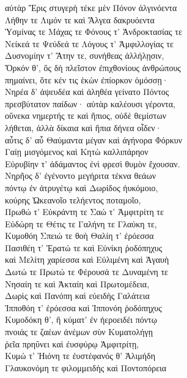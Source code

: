 \begin{pages}
\begin{Leftside}
\quad{}αὐτὰρ Ἔρις στυγερὴ τέκε μὲν Πόνον ἀλγινόεντα\\
Λήθην τε Λιμόν τε καὶ Ἄλγεα δακρυόεντα\\
Ὑσμίνας τε Μάχας τε Φόνους τ' Ἀνδροκτασίας τε\\
Νείκεά τε Ψεύδεά τε Λόγους τ' Ἀμφιλλογίας τε \\
Δυσνομίην τ' Ἄτην τε, συνήθεας ἀλλήλῃσιν, \\
Ὅρκόν θ', ὃς δὴ πλεῖστον ἐπιχθονίους ἀνθρώπους\\
πημαίνει, ὅτε κέν τις ἑκὼν ἐπίορκον ὀμόσσῃ· \\[5pt]

Νηρέα δ' ἀψευδέα καὶ ἀληθέα γείνατο Πόντος \\
πρεσβύτατον παίδων· αὐτὰρ καλέουσι γέροντα, \\
οὕνεκα νημερτής τε καὶ ἤπιος, οὐδὲ θεμίστων \\
λήθεται, ἀλλὰ δίκαια καὶ ἤπια δήνεα οἶδεν· \\
αὖτις δ' αὖ Θαύμαντα μέγαν καὶ ἀγήνορα Φόρκυν\\
Γαίῃ μισγόμενος καὶ Κητὼ καλλιπάρηον \\
Εὐρυβίην τ' ἀδάμαντος ἐνὶ φρεσὶ θυμὸν ἔχουσαν.\\
Νηρῆος δ' ἐγένοντο μεγήριτα τέκνα θεάων \\
πόντῳ ἐν ἀτρυγέτῳ καὶ Δωρίδος ἠυκόμοιο,\\
κούρης Ὠκεανοῖο τελήεντος ποταμοῖο, \\
Πρωθώ τ' Εὐκράντη τε Σαώ τ' Ἀμφιτρίτη τε \\
Εὐδώρη τε Θέτις τε Γαλήνη τε Γλαύκη τε,\\
Κυμοθόη Σπειώ τε θοὴ Θαλίη τ' ἐρόεσσα \\
Πασιθέη τ' Ἐρατώ τε καὶ Εὐνίκη ῥοδόπηχυς\\
καὶ Μελίτη χαρίεσσα καὶ Εὐλιμένη καὶ Ἀγαυὴ\\
Δωτώ τε Πρωτώ τε Φέρουσά τε Δυναμένη τε\\
Νησαίη τε καὶ Ἀκταίη καὶ Πρωτομέδεια,\\
Δωρὶς καὶ Πανόπη καὶ εὐειδὴς Γαλάτεια  \\
Ἱπποθόη τ' ἐρόεσσα καὶ Ἱππονόη ῥοδόπηχυς\\
Κυμοδόκη θ', ἣ κύματ' ἐν ἠεροειδέι πόντῳ\\
πνοιάς τε ζαέων ἀνέμων σὺν Κυματολήγῃ\\
ῥεῖα πρηΰνει καὶ ἐυσφύρῳ Ἀμφιτρίτῃ,\\
Κυμώ τ' Ἠιόνη τε ἐυστέφανός θ' Ἁλιμήδη \\
Γλαυκονόμη τε φιλομμειδὴς καὶ Ποντοπόρεια\\

\end{Leftside}
\end{pages}
